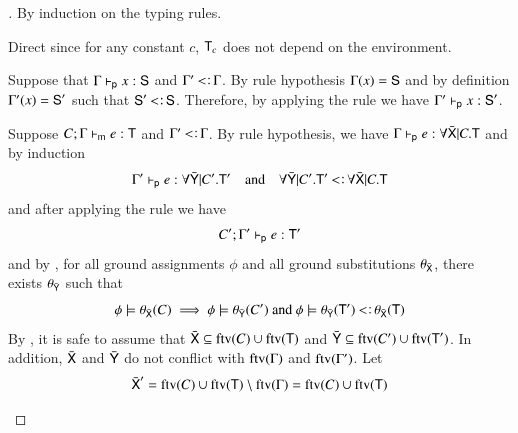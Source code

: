 \documentclass{report}
\begin{document}
  \begin{proof}[]
  	By induction on the typing rules.
    \begin{indcase}{\sdbase}
      Direct since for any constant $c$, $\textsf{T}_c$ does not depend on the environment.
    \end{indcase}
    \begin{indcase}{\sdvar}
      Suppose that $\Gamma\vdash_\textsf{p} x:\textsf{S}$ and $\Gamma'\subtype\Gamma$.
      By rule hypothesis $\Gamma(x)=\textsf{S}$
      and by definition $\Gamma'(x)=\textsf{S}'$ such that
      $\type{S}'\subtype\type{S}$.
      Therefore, by applying the \sdvar rule we have
      $\Gamma'\vdash_\textsf{p} x:\textsf{S}'$.
    \end{indcase}
    \begin{indcase}{\sdstart}
      Suppose $C;\Gamma\vdash_\textsf{m} e:\textsf{T}$ and $\Gamma'\subtype\Gamma$.
      By rule hypothesis, we have
      $\Gamma\vdash_\textsf{p} e:\forall\bar{\textsf{X}}|C.\textsf{T}$ and by induction
      \begin{displaymath}
        \Gamma'\entailsp e:\forall\bar{\type{Y}}|C'.\type{T}'\quad\textrm{and}\quad
        \forall\bar{\type{Y}}|C'.\type{T}'\subtype\forall\bar{\type{X}}|C.\type{T}
      \end{displaymath}
      and after applying the \sdstart rule we have
      \begin{displaymath}
        C';\Gamma'\vdash_\textsf{p} e:\textsf{T}'
      \end{displaymath}
      and by , for all
      ground assignments $\phi$ and all ground substitutions $\theta_{\bar{\textsf{X}}}$,
      there exists $\theta_{\bar{\textsf{Y}}}$ such that
      \begin{displaymath}
        \phi\csat\theta_{\bar{\type{X}}}(C) \implies
        \phi\csat\theta_{\bar{\type{Y}}}(C')\textrm{ and }
        \phi\csat\theta_{\bar{\type{Y}}}(\type{T}')\subtype\theta_{\bar{\type{X}}}(\type{T})
      \end{displaymath}
      By , it is safe to assume that
      $\bar{\textsf{X}}\subseteq\mathop{\rm ftv}\nolimits(C)\cup\mathop{\rm ftv}\nolimits(\textsf{T})$ and $\bar{\textsf{Y}}\subseteq\mathop{\rm ftv}\nolimits(C')\cup\mathop{\rm ftv}\nolimits(\textsf{T}')$.
      In addition, $\bar{\textsf{X}}$ and $\bar{\textsf{Y}}$ do not
      conflict with $\mathop{\rm ftv}\nolimits(\Gamma)$ and $\mathop{\rm ftv}\nolimits(\Gamma')$. Let
      \begin{displaymath}
        \begin{array}{l}
          \bar{\textsf{X}}' = \mathop{\rm ftv}\nolimits(C)\cup\mathop{\rm ftv}\nolimits(\textsf{T})\setminus\mathop{\rm ftv}\nolimits(\Gamma)=\mathop{\rm ftv}\nolimits(C)\cup\mathop{\rm ftv}\nolimits(\textsf{T})\\

\end{array}
\end{displaymath}
\end{indcase}
\end{proof}
\end{document}
